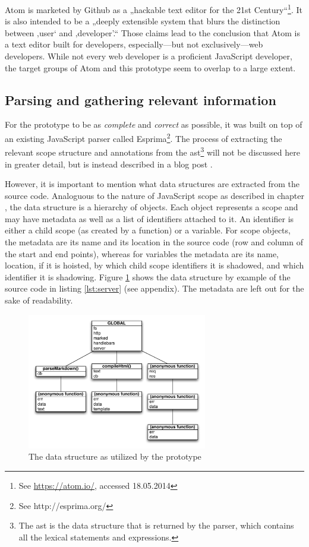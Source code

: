 Atom is marketed by Github as a „hackable text editor for the 21st
Century“\footnote{See \url{https://atom.io/}, accessed 18.05.2014}. It
is also intended to be a „deeply extensible system that blurs the
distinction between ‚user‘ and ‚developer’.“ Those claims lead to the
conclusion that Atom is a text editor built for developers,
especially—but not exclusively—web developers. While not every web
developer is a proficient JavaScript developer, the target groups of
Atom and this prototype seem to overlap to a large extent.

\subsection{Parsing and gathering relevant
information}\label{parsing-and-gathering-relevant-information}

For the prototype to be as \emph{complete} and \emph{correct} as
possible, it was built on top of an existing JavaScript parser called
Esprima\footnote{See http://esprima.org/}. The process of extracting the
relevant scope structure and annotations from the
\ac{ast}\footnote{The \ac{ast} is the data structure that is returned by the parser, which contains all the lexical statements and expressions.}
will not be discussed here in greater detail, but is instead described
in a blog post \cite{tvo}.

However, it is important to mention what data structures are extracted
from the source code. Analoguous to the nature of JavaScript scope as
described in chapter , the data structure is a
hierarchy of objects. Each object represents a scope and may have
metadata as well as a list of identifiers attached to it. An identifier
is either a child scope (as created by a function) or a variable. For
scope objects, the metadata are its name and its location in the source
code (row and column of the start and end points), whereas for variables
the metadata are its name, location, if it is hoisted, by which child
scope identifiers it is shadowed, and which identifier it is shadowing.
Figure \ref{fig:scope} shows the data structure by example of the source
code in listing \ref{lst:server} (see appendix). The metadata are left
out for the sake of readability.

\begin{figure}[htbp]
\centering
\includegraphics[keepaspectratio,width=0.7\textwidth]{img/scope.pdf}
\caption{The data structure as utilized by the prototype}
\label{fig:scope}
\end{figure}

